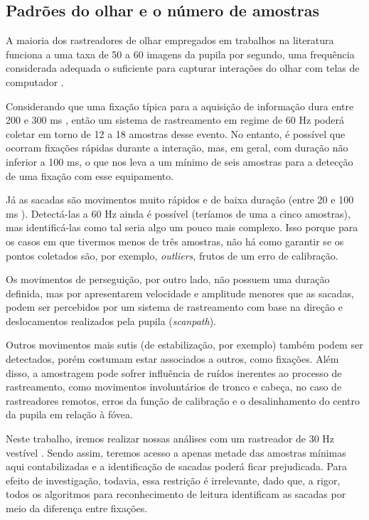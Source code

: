 \documentclass[12pt]{article}
\begin{document}
		\subsection{Padrões do olhar e o número de amostras}
		A maioria dos rastreadores de olhar empregados em trabalhos na literatura funciona a uma taxa de 50 a 60 imagens da pupila por segundo, uma frequência considerada adequada o suficiente para capturar interações do olhar com telas de computador \cite{Goldberg-1999}. 
		
		Considerando que uma fixação típica para a aquisição de informação dura entre 200 e 300 ms \cite{Rayner-1998, Goldberg-1999}, então um sistema de rastreamento em regime de 60 Hz poderá coletar em torno de 12 a 18 amostras desse evento. No entanto, é possível que ocorram fixações rápidas durante a interação, mas, em geral, com duração não inferior a 100 ms, o que nos leva a um mínimo de seis amostras para a detecção de uma fixação com esse equipamento.
		
		Já as sacadas são movimentos muito rápidos e de baixa duração (entre 20 e 100 ms \cite{Rayner-1998, Reichle-1998}). Detectá-las a 60 Hz ainda é possível (teríamos de uma a cinco amostras), mas identificá-las como tal seria algo um pouco mais complexo. Isso porque para os casos em que tivermos menos de três amostras, não há como garantir se os pontos coletados são, por exemplo, \textit{outliers}, frutos de um erro de calibração. 
		
		Os movimentos de perseguição, por outro lado, não possuem uma duração definida, mas por apresentarem velocidade e amplitude menores que as sacadas, podem ser percebidos por um sistema de rastreamento com base na direção e deslocamentos realizados pela pupila (\textit{scanpath}). 
		
		Outros movimentos mais sutis (de estabilização, por exemplo) também podem ser detectados, porém costumam estar associados a outros, como fixações. Além disso, a amostragem pode sofrer influência de ruídos inerentes ao processo de rastreamento, como movimentos involuntários de tronco e cabeça, no caso de rastreadores remotos, erros da função de calibração e o desalinhamento do centro da pupila em relação à fóvea.
		
		Neste trabalho, iremos realizar nossas análises com um rastreador de 30 Hz vestível \cite{Kassner-2014}. Sendo assim, teremos acesso a apenas metade das amostras mínimas aqui contabilizadas e a identificação de sacadas poderá ficar prejudicada. Para efeito de investigação, todavia, essa restrição é irrelevante, dado que, a rigor, todos os algoritmos para reconhecimento de leitura identificam as sacadas por meio da diferença entre fixações.
		
\end{document}
